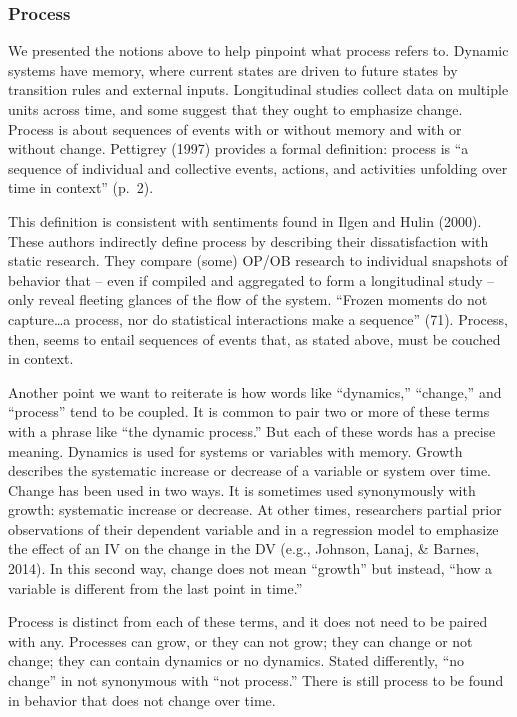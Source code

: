 \documentclass[english,,man]{apa6}
\theoremstyle{definition}
\theoremstyle{definition}
\theoremstyle{definition}
\theoremstyle{remark}
\begin{document}
\hypertarget{process-1}{%
\subsubsection{Process}\label{process-1}}

We presented the notions above to help pinpoint what process refers to.
Dynamic systems have memory, where current states are driven to future
states by transition rules and external inputs. Longitudinal studies
collect data on multiple units across time, and some suggest that they
ought to emphasize change. Process is about sequences of events with or
without memory and with or without change. Pettigrey (1997) provides a
formal definition: process is \enquote{a sequence of individual and
collective events, actions, and activities unfolding over time in
context} (p.~2).

This definition is consistent with sentiments found in Ilgen and Hulin
(2000). These authors indirectly define process by describing their
dissatisfaction with static research. They compare (some) OP/OB research
to individual snapshots of behavior that -- even if compiled and
aggregated to form a longitudinal study -- only reveal fleeting glances
of the flow of the system. \enquote{Frozen moments do not
capture\ldots{}a process, nor do statistical interactions make a
sequence} (71). Process, then, seems to entail sequences of events that,
as stated above, must be couched in context.

Another point we want to reiterate is how words like \enquote{dynamics,}
\enquote{change,} and \enquote{process} tend to be coupled. It is common
to pair two or more of these terms with a phrase like \enquote{the
dynamic process.} But each of these words has a precise meaning.
Dynamics is used for systems or variables with memory. Growth describes
the systematic increase or decrease of a variable or system over time.
Change has been used in two ways. It is sometimes used synonymously with
growth: systematic increase or decrease. At other times, researchers
partial prior observations of their dependent variable and in a
regression model to emphasize the effect of an IV on the change in the
DV (e.g., Johnson, Lanaj, \& Barnes, 2014). In this second way, change
does not mean \enquote{growth} but instead, \enquote{how a variable is
different from the last point in time.}

Process is distinct from each of these terms, and it does not need to be
paired with any. Processes can grow, or they can not grow; they can
change or not change; they can contain dynamics or no dynamics. Stated
differently, \enquote{no change} in not synonymous with \enquote{not
process.} There is still process to be found in behavior that does not
change over time.
\end{document}

